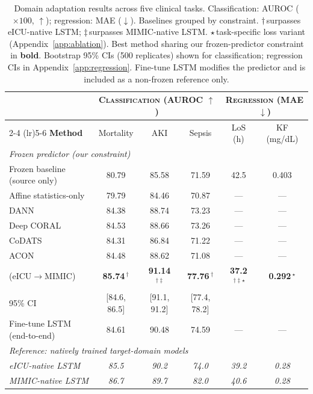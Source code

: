 \begin{table}[!tb]
\centering
\setlength{\tabcolsep}{5pt}
\caption{Domain adaptation results across five clinical tasks. Classification: AUROC ($\times 100$, $\uparrow$); regression: MAE ($\downarrow$). Baselines grouped by constraint. $\dagger$\,surpasses eICU-native LSTM; $\ddagger$\,surpasses MIMIC-native LSTM. $\star$\,task-specific loss variant (Appendix~\ref{app:ablation}). Best method sharing our frozen-predictor constraint in \textbf{bold}. Bootstrap 95\% CIs (500 replicates) shown for classification; regression CIs in Appendix~\ref{app:regression}. Fine-tune LSTM modifies the predictor and is included as a non-frozen reference only.}
\label{tab:main-results}
\vskip 0.1in
\small
\begin{tabular}{@{}l ccc cc@{}}
\toprule
& \multicolumn{3}{c}{\textsc{Classification} (AUROC $\uparrow$)} & \multicolumn{2}{c}{\textsc{Regression} (MAE $\downarrow$)} \\
\cmidrule(lr){2-4} \cmidrule(lr){5-6}
\textbf{Method} & Mortality & AKI & Sepsis & LoS (h) & KF (mg/dL) \\
\midrule
\multicolumn{6}{l}{\emph{Frozen predictor (our constraint)}} \\
Frozen baseline (source only) & 80.79 & 85.58 & 71.59 & 42.5 & 0.403 \\
Affine statistics-only & 79.79 & 84.46 & 70.87 & --- & --- \\
DANN & 84.38 & 88.74 & 73.23 & --- & --- \\
Deep CORAL & 84.53 & 88.66 & 73.26 & --- & --- \\
CoDATS & 84.31 & 86.84 & 71.22 & --- & --- \\
ACON & 84.48 & 88.62 & 71.08 & --- & --- \\
\retr{} (eICU$\to$MIMIC) & \textbf{85.74}$\,^{\dagger}$ & \textbf{91.14}$\,^{\dagger\ddagger}$ & \textbf{77.76}$\,^{\dagger}$ & \textbf{37.2}$\,^{\dagger\ddagger\star}$ & \textbf{0.292}$\,^{\star}$ \\
{\scriptsize 95\% CI} & {\scriptsize [84.6, 86.5]} & {\scriptsize [91.1, 91.2]} & {\scriptsize [77.4, 78.2]} & & \\
\midrule
Fine-tune LSTM (end-to-end) & 84.61 & 90.48 & 74.59 & --- & --- \\
\midrule
\multicolumn{6}{l}{\emph{Reference: natively trained target-domain models}} \\
\textit{eICU-native LSTM} & \textit{85.5} & \textit{90.2} & \textit{74.0} & \textit{39.2} & \textit{0.28} \\
\textit{MIMIC-native LSTM} & \textit{86.7} & \textit{89.7} & \textit{82.0} & \textit{40.6} & \textit{0.28} \\
\bottomrule
\end{tabular}
\end{table}

